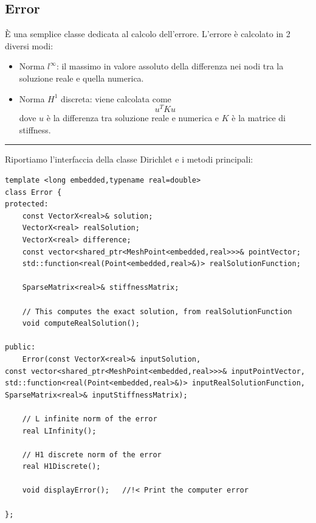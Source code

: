 \documentclass[oneside,12pt]{book}  %
\theoremstyle{plain}
\theoremstyle{definition}
\theoremstyle{remark}
\numberwithin{equation}{chapter} %
\begin{document}
\subsection{Error}
\`E una semplice classe dedicata al calcolo dell'errore. L'errore \`e
calcolato in 2 diversi modi:
\begin{itemize}
\item Norma $l^\infty$: il massimo in valore assoluto della differenza
  nei nodi tra la soluzione reale e quella numerica.

\item Norma $H^1$ discreta: viene calcolata come $$u^TKu$$ dove $u$
  \`e la differenza tra soluzione reale e numerica e $K$ \`e la matrice di stiffness.

\end{itemize}

\noindent\rule{14cm}{1pt}

Riportiamo l'interfaccia della classe Dirichlet e i metodi principali:

\begin{verbatim}
template <long embedded,typename real=double>
class Error {
protected:
    const VectorX<real>& solution;
    VectorX<real> realSolution;
    VectorX<real> difference;
    const vector<shared_ptr<MeshPoint<embedded,real>>>& pointVector;
    std::function<real(Point<embedded,real>&)> realSolutionFunction;
	
    SparseMatrix<real>& stiffnessMatrix;
	
    // This computes the exact solution, from realSolutionFunction
    void computeRealSolution(); 
	
public:
    Error(const VectorX<real>& inputSolution,
const vector<shared_ptr<MeshPoint<embedded,real>>>& inputPointVector,
std::function<real(Point<embedded,real>&)> inputRealSolutionFunction,
SparseMatrix<real>& inputStiffnessMatrix);

    // L infinite norm of the error
    real LInfinity();
	
    // H1 discrete norm of the error
    real H1Discrete();
	
    void displayError();   //!< Print the computer error
	
};


\end{verbatim}
\end{document}
